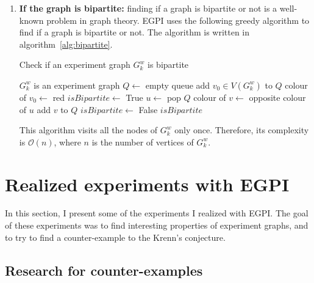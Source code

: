 \begin{enumerate}
    \item \textbf{If the graph is bipartite:} finding if a graph is bipartite or not is a well-known problem in graph theory.
        EGPI uses the following greedy algorithm to find if a graph is bipartite or not.
        The algorithm is written in algorithm~\ref{alg:bipartite}.
        \begin{algorithm}
            \caption{Check if an experiment graph $G_k^w$ is bipartite}
            \label{alg:bipartite}
            \begin{algorithmic}
                \Require $G_k^w$ is an experiment graph
                \State $Q \gets$ empty queue
                \State add $v_0 \in V(G_k^w)$ to $Q$
                \State colour of $v_0 \gets$ red
                \State $isBipartite \gets$ True
                    \State $u \gets$ pop $Q$
                            \State colour of $v \gets$ opposite colour of $u$
                            \State add $v$ to $Q$
                            \State $isBipartite \gets$ False
                        \EndIf
                    \EndFor
                \EndWhile
                \State \Return $isBipartite$
            \end{algorithmic}
        \end{algorithm}

        This algorithm visits all the nodes of $G_k^w$ only once.
        Therefore, its complexity is $\mathcal{O}(n)$, where $n$ is the number of vertices of $G_k^w$.

\end{enumerate}


\section{Realized experiments with EGPI}
\label{sec:realized_experiments}

In this section, I present some of the experiments I realized with EGPI. The goal of these experiments was to find interesting properties of experiment graphs, and to try to find a counter-example to the Krenn's conjecture.\\

\subsection{Research for counter-examples}
\label{subsec:research-for-counter-examples}

